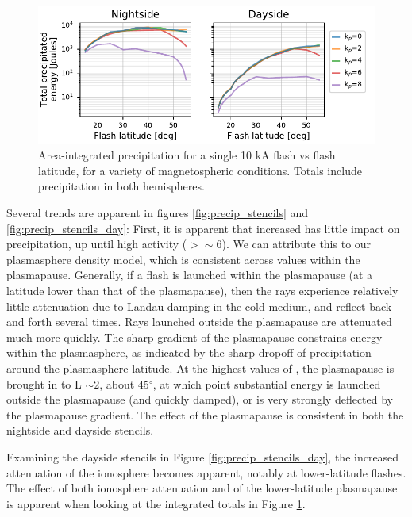 \begin{figure}[]
\begin{center}
\includegraphics{figures/total_energy_vs_latitude.pdf}
\caption[Total precipitated energy for a single flash]{Area-integrated precipitation for a single 10 kA flash vs flash latitude, for a variety of magnetospheric conditions. Totals include precipitation in both hemispheres.}
\label{fig:total_energy_per_stencil}
\end{center}
\end{figure}

Several trends are apparent in figures \ref{fig:precip_stencils} and \ref{fig:precip_stencils_day}: First, it is apparent that increased \kp{} has little impact on precipitation, up until high activity (\kp{}$ > \sim 6$). We can attribute this to our plasmasphere density model, which is consistent across \kp{} values within the plasmapause. Generally, if a flash is launched within the plasmapause (at a latitude lower than that of the plasmapause), then the rays experience relatively little attenuation due to Landau damping in the cold medium, and reflect back and forth several times. Rays launched outside the plasmapause are attenuated much more quickly. The sharp gradient of the plasmapause constrains energy within the plasmasphere, as indicated by the sharp dropoff of precipitation around the plasmasphere latitude. At the highest values of \kp{}, the plasmapause is brought in to L $\sim 2$, about 45$^\circ$, at which point substantial energy is launched outside the plasmapause (and quickly damped), or is very strongly deflected by the plasmapause gradient. The effect of the plasmapause is consistent in both the nightside and dayside stencils.

Examining the dayside stencils in Figure \ref{fig:precip_stencils_day}, the increased attenuation of the ionosphere becomes apparent, notably at lower-latitude flashes. The effect of both ionosphere attenuation and of the lower-latitude plasmapause is apparent when looking at the integrated totals in Figure \ref{fig:total_energy_per_stencil}.

